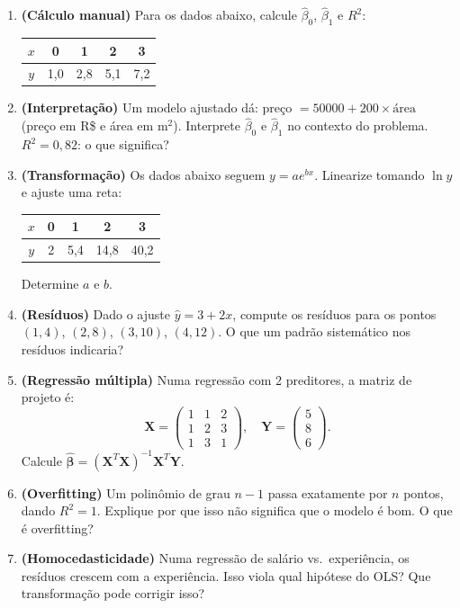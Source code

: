 \documentclass[12pt,a4paper]{article}
\begin{document}
\begin{enumerate}
  \item \textbf{(C\'alculo manual)} Para os dados abaixo, calcule $\hat\beta_0$, $\hat\beta_1$ e $R^2$:
    \begin{center}
    \begin{tabular}{|c|c|c|c|c|}
    \hline
    $x$ & 0 & 1 & 2 & 3 \\ \hline
    $y$ & 1{,}0 & 2{,}8 & 5{,}1 & 7{,}2 \\ \hline
    \end{tabular}
    \end{center}
  
  \item \textbf{(Interpreta\c{c}\~ao)} Um modelo ajustado d\'a: pre\c{c}o $= 50000 + 200 \times \text{\'area}$ (pre\c{c}o em R\$ e \'area em m$^2$). Interprete $\hat\beta_0$ e $\hat\beta_1$ no contexto do problema. $R^2 = 0{,}82$: o que significa?
  
  \item \textbf{(Transforma\c{c}\~ao)} Os dados abaixo seguem $y = a e^{bx}$. Linearize tomando $\ln y$ e ajuste uma reta:
    \begin{center}
    \begin{tabular}{|c|c|c|c|c|}
    \hline
    $x$ & 0 & 1 & 2 & 3 \\ \hline
    $y$ & 2 & 5{,}4 & 14{,}8 & 40{,}2 \\ \hline
    \end{tabular}
    \end{center}
    Determine $a$ e $b$.
  
  \item \textbf{(Res\'iduos)} Dado o ajuste $\hat y = 3 + 2x$, compute os res\'iduos para os pontos $(1,4)$, $(2,8)$, $(3,10)$, $(4,12)$. O que um padr\~ao sistem\'atico nos res\'iduos indicaria?
  
  \item \textbf{(Regress\~ao m\'ultipla)} Numa regress\~ao com 2 preditores, a matriz de projeto \'e:
    \[
    \mathbf{X} = \begin{pmatrix}1 & 1 & 2\\ 1 & 2 & 3\\ 1 & 3 & 1\end{pmatrix}, \quad \mathbf{Y} = \begin{pmatrix}5\\ 8\\ 6\end{pmatrix}.
    \]
    Calcule $\hat{\boldsymbol\beta} = (\mathbf{X}^T\mathbf{X})^{-1}\mathbf{X}^T\mathbf{Y}$.
  
  \item \textbf{(Overfitting)} Um polin\^omio de grau $n-1$ passa exatamente por $n$ pontos, dando $R^2=1$. Explique por que isso n\~ao significa que o modelo \'e bom. O que \'e overfitting?
  
  \item \textbf{(Homocedasticidade)} Numa regress\~ao de sal\'ario vs.\ experi\^encia, os res\'iduos crescem com a experi\^encia. Isso viola qual hip\'otese do OLS? Que transforma\c{c}\~ao pode corrigir isso?
\end{enumerate}
\end{document}

